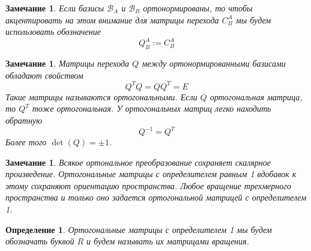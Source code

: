\documentclass[12pt]{article}
\newtheorem{remark}[theorem]{Замечание}
\newtheorem{definition}[theorem]{Определение}
\begin{document}
\begin{remark}
    Если базисы $\mathcal{B}_A$ и $\mathcal{B}_B$ ортонормированы, то чтобы акцентировать
    на этом внимание для матрицы перехода $C_B^A$ мы будем использовать обозначение
    $$
        Q_B^A:=C_B^A
    $$
\end{remark}

\begin{remark}
    Матрицы перехода $Q$ между ортонормированными базисами обладают свойством
    $$
        Q^T Q=Q Q^T=E
    $$
    Такие матрицы называются ортогональными. Если $Q$ ортогональная матрица, то $Q^T$ тоже ортогональная.
    У ортогональных матриц легко находить обратную
    $$
        Q^{-1}=Q^T
    $$
    Более того $\det(Q)=\pm 1$.
\end{remark}

\begin{remark}
    Всякое ортональное преобразование сохраняет скалярное произведение. Ортогональные матрицы
    с определителем равным 1 вдобавок к этому сохраняют ориентацию пространства.
    Любое вращение трехмерного пространства и только оно задается ортогональной
    матрицей с определителем 1.
\end{remark}

\begin{definition}
    Ортогональные матрицы с определителем 1 мы будем обозначать буквой $R$ и будем
    называть их матрицами вращения.
\end{definition}
\end{document}
